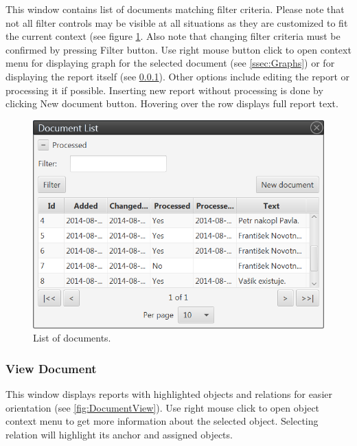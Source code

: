 \documentclass[12pt,a4paper]{report}
\begin{document}
This window contains list of documents matching filter criteria. Please note
that not all filter controls may be visible at all situations as they are
customized to fit the current context (see figure \ref{fig:DocumentList}.
Also note that changing filter criteria must be confirmed by pressing Filter
button. Use right mouse button click to open context menu for displaying graph
for the selected document (see \ref{ssec:Graphs}) or for displaying the report
itself (see \ref{sssec:DocumentView}). Other options include editing the report
or processing it if possible. Inserting new report without processing is done
by clicking New document button. Hovering over the row displays full report
text.

\begin{figure}[!htb]
        \centering
        \includegraphics[width=\textwidth]{Images/documentlist}
        \caption{List of documents.}
        \label{fig:DocumentList}
\end{figure}

\subsubsection{View Document}
\label{sssec:DocumentView}

This window displays reports with highlighted objects and relations for easier
orientation (see \ref{fig:DocumentView}). Use right mouse click to open object
context menu to get more information about the selected object. Selecting
relation will highlight its anchor and assigned objects.
\end{document}
